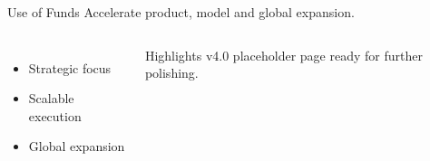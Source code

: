 
\begin{frame}{Use of Funds}
\vspace{0.3cm}
{\large Accelerate product, model and global expansion.}

\vspace{0.6cm}
\begin{columns}[T]
\begin{itemize}
\item Strategic focus
\item Scalable execution
\item Global expansion
\end{itemize}
\begin{block}{Highlights}
v4.0 placeholder page ready for further polishing.
\end{block}
\end{columns}
\end{frame}
